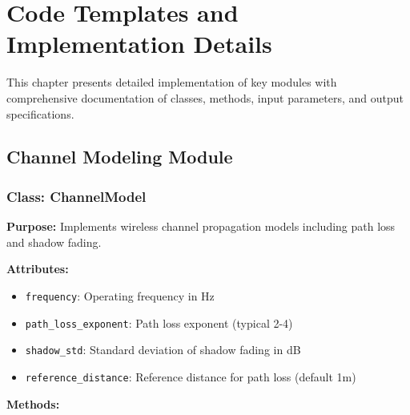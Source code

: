 \documentclass[12pt,a4paper]{article}
\begin{document}
\thispagestyle{plain}


\clearpage

\section{Code Templates and Implementation Details}

This chapter presents detailed implementation of key modules with comprehensive documentation of classes, methods, input parameters, and output specifications.

\subsection{Channel Modeling Module}

\subsubsection{Class: ChannelModel}

\textbf{Purpose:} Implements wireless channel propagation models including path loss and shadow fading.

\textbf{Attributes:}
\begin{itemize}
    \item \texttt{frequency}: Operating frequency in Hz
    \item \texttt{path\_loss\_exponent}: Path loss exponent (typical 2-4)
    \item \texttt{shadow\_std}: Standard deviation of shadow fading in dB
    \item \texttt{reference\_distance}: Reference distance for path loss (default 1m)
\end{itemize}

\textbf{Methods:}
\end{document}

